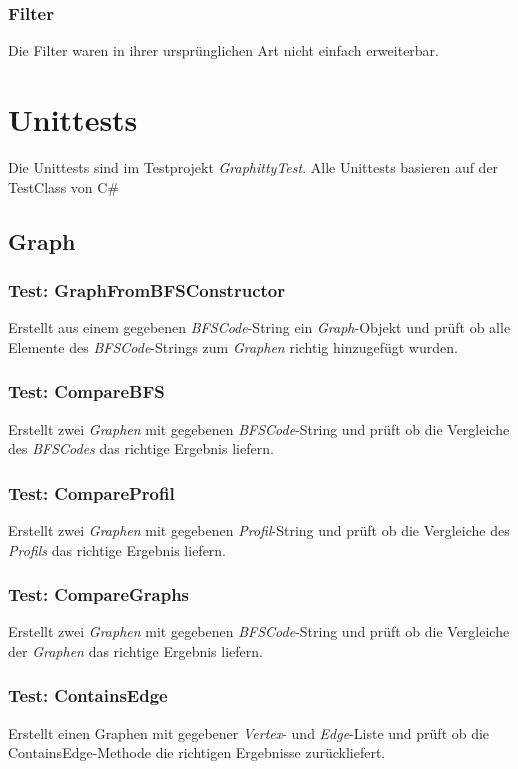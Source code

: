 \documentclass[13pt]{scrreprt}
\begin{document}
\subsection{Filter}
Die Filter waren in ihrer ursprünglichen Art nicht einfach erweiterbar.

\chapter{Unittests}
Die Unittests sind im Testprojekt \textit{GraphittyTest}. Alle Unittests basieren auf der TestClass von C\#
\section{Graph}
\subsection{Test: GraphFromBFSConstructor}
Erstellt aus einem gegebenen \textit{BFSCode}-String ein \textit{Graph}-Objekt und prüft ob alle Elemente des \textit{BFSCode}-Strings zum \textit{Graphen} richtig hinzugefügt wurden.

\subsection{Test: CompareBFS}
Erstellt zwei \textit{Graphen} mit gegebenen \textit{BFSCode}-String und prüft ob die Vergleiche des \textit{BFSCodes} das richtige Ergebnis liefern.

\subsection{Test: CompareProfil}
Erstellt zwei \textit{Graphen} mit gegebenen \textit{Profil}-String und prüft ob die Vergleiche des \textit{Profils} das richtige Ergebnis liefern.

\subsection{Test: CompareGraphs}
Erstellt zwei \textit{Graphen} mit gegebenen \textit{BFSCode}-String und prüft ob die Vergleiche der \textit{Graphen} das richtige Ergebnis liefern.

\subsection{Test: ContainsEdge}
Erstellt einen Graphen mit gegebener \textit{Vertex}- und \textit{Edge}-Liste und prüft ob die ContainsEdge-Methode die richtigen Ergebnisse zurückliefert.
\end{document}
